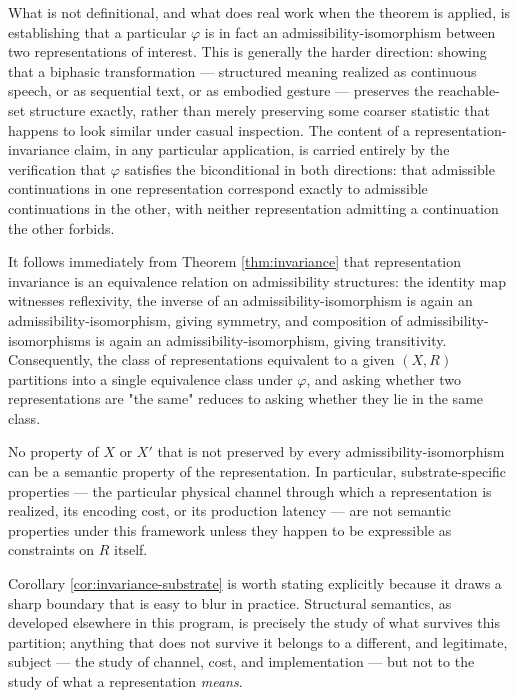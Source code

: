 What is not definitional, and what does real work when the theorem is
applied, is establishing that a particular $\varphi$ is in fact an
admissibility-isomorphism between two representations of interest. This
is generally the harder direction: showing that a biphasic transformation
--- structured meaning realized as continuous speech, or as sequential
text, or as embodied gesture --- preserves the reachable-set structure
exactly, rather than merely preserving some coarser statistic that
happens to look similar under casual inspection. The content of a
representation-invariance claim, in any particular application, is
carried entirely by the verification that $\varphi$ satisfies the
biconditional in both directions: that admissible continuations in one
representation correspond exactly to admissible continuations in the
other, with neither representation admitting a continuation the other
forbids.

\begin{remark}
It follows immediately from Theorem \ref{thm:invariance} that
representation invariance is an equivalence relation on admissibility
structures: the identity map witnesses reflexivity, the inverse of an
admissibility-isomorphism is again an admissibility-isomorphism, giving
symmetry, and composition of admissibility-isomorphisms is again an
admissibility-isomorphism, giving transitivity. Consequently, the class
of representations equivalent to a given $(X, R)$ partitions into a
single equivalence class under $\varphi$, and asking whether two
representations are "the same" reduces to asking whether they lie in the
same class.
\end{remark}

\begin{corollary}
\label{cor:invariance-substrate}
No property of $X$ or $X'$ that is not preserved by every
admissibility-isomorphism can be a semantic property of the
representation. In particular, substrate-specific properties --- the
particular physical channel through which a representation is realized,
its encoding cost, or its production latency --- are not semantic
properties under this framework unless they happen to be expressible as
constraints on $R$ itself.
\end{corollary}

Corollary \ref{cor:invariance-substrate} is worth stating explicitly
because it draws a sharp boundary that is easy to blur in practice.
Structural semantics, as developed elsewhere in this program, is
precisely the study of what survives this partition; anything that does
not survive it belongs to a different, and legitimate, subject ---
the study of channel, cost, and implementation --- but not to the study
of what a representation \emph{means}.
